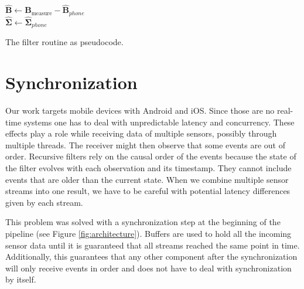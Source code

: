 \begin{algorithm}[h]
	$\bm{\hat{B}} \leftarrow \bm{B}_\text{measure} - \bm{\hat{B}}_{phone}$\\
    $\bm{\hat{\Sigma}} \leftarrow \bm{\hat{\Sigma}}_{phone}$\\
	\caption{The filter routine as pseudocode.}
	\label{alg:routine}
\end{algorithm}

\section{Synchronization}
\label{sec:impl_synchro}

Our work targets mobile devices with Android and iOS. Since those are no real-time systems one has to deal with unpredictable latency and concurrency. These effects play a role while receiving data of multiple sensors, possibly through multiple threads. The receiver might then observe that some events are out of order. Recursive filters rely on the causal order of the events because the state of the filter evolves with each observation and its timestamp. They cannot include events that are older than the current state. When we combine multiple sensor streams into one result, we have to be careful with potential latency differences given by each stream.

This problem was solved with a synchronization step at the beginning of the pipeline (see Figure \ref{fig:architecture}). Buffers are used to hold all the incoming sensor data until it is guaranteed that all streams reached the same point in time. Additionally, this guarantees that any other component after the synchronization will only receive events in order and does not have to deal with synchronization by itself.

